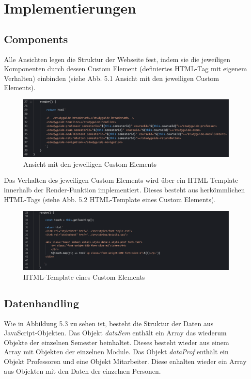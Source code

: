 \documentclass[12pt,					%
							 oneside,			%
							 a4paper,			%
							 halfparskip,		%
							 liststotoc,			%
							 bibtotoc,			%
							 fleqn,				%
							 pointlessnumbers]	%
							 {scrreprt}
\begin{document}
\chapter{Implementierungen}  

	\section{Components}
	Alle Ansichten legen die Struktur der Webseite fest, indem sie die jeweiligen Komponenten durch dessen Custom Element (definiertes HTML-Tag mit eigenem Verhalten) einbinden (siehe Abb. 5.1 Ansicht mit den jeweiligen Custom Elements). 
	
	\begin{figure}[h]
		\centering
		\includegraphics[width=1\textwidth]{pictures/custom-element.png}
		\caption{Ansicht mit den jeweiligen  Custom Elements}						
		\label{custom-element}
	\end{figure}
	
	Das Verhalten des jeweiligen Custom Elements wird über ein HTML-Template innerhalb der Render-Funktion implementiert. Dieses besteht aus herkömmlichen HTML-Tags (siehe Abb. 5.2 HTML-Template eines Custom Elements).

	\begin{figure}[h]
		\centering
		\includegraphics[width=1\textwidth]{pictures/html-template.png}
		\caption{HTML-Template eines Custom Elements}						
		\label{html-template}
	\end{figure}
	
	\section{Datenhandling}
	Wie in Abbildung 5.3 zu sehen ist, besteht die Struktur der Daten aus JavaScript-Objekten. Das Objekt \textit{dataSem} enthält ein Array das wiederum Objekte der einzelnen Semester beinhaltet. Dieses besteht wieder aus einem Array mit Objekten der einzelnen Module.  Das Objekt \textit{dataProf} enthält ein Objekt Professoren und eine Objekt Mitarbeiter. Diese enhalten wieder ein Array aus Objekten mit den Daten der einzelnen Personen.
	
\end{document}
